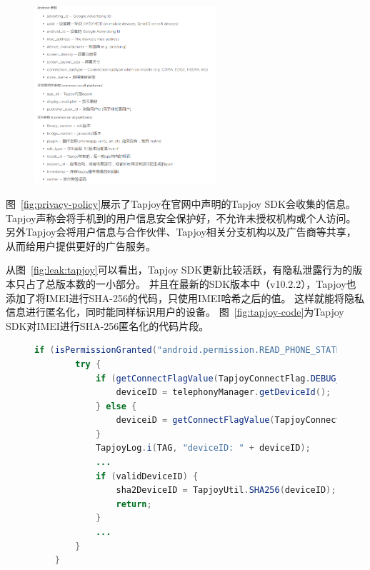 \begin{figure}
	\centering
	\includegraphics[width=0.6\textwidth]{figure/privacy-policy.png}
\end{figure}

图~\ref{fig:privacy-policy}展示了Tapjoy在官网中声明的Tapjoy SDK会收集的信息。
Tapjoy声称会将手机到的用户信息安全保护好，不允许未授权机构或个人访问。
另外Tapjoy会将用户信息与合作伙伴、Tapjoy相关分支机构以及广告商等共享，从而给用户提供更好的广告服务。

从图~\ref{fig:leak:tapjoy}可以看出，Tapjoy SDK更新比较活跃，有隐私泄露行为的版本只占了总版本数的一小部分。
并且在最新的SDK版本中（v10.2.2），Tapjoy也添加了将IMEI进行SHA-256的代码，只使用IMEI哈希之后的值。
这样就能将隐私信息进行匿名化，同时能同样标识用户的设备。
图~\ref{fig:tapjoy-code}为Tapjoy SDK对IMEI进行SHA-256匿名化的代码片段。

\begin{figure}[!h]
	\centering
	\begin{lstlisting}[language={java}]
	if (isPermissionGranted("android.permission.READ_PHONE_STATE")) {
		try {
			if (getConnectFlagValue(TapjoyConnectFlag.DEBUG_DEVICE_ID) == null || getConnectFlagValue(TapjoyConnectFlag.DEBUG_DEVICE_ID).length() <= 0) {
				deviceID = telephonyManager.getDeviceId();
			} else {
				deviceiD = getConnectFlagValue(TapjoyConnectFlag.DEBUG_DEVICE_ID);
			}
			TapjoyLog.i(TAG, "deviceID: " + deviceID);
			...
			if (validDeviceID) {
				sha2DeviceID = TapjoyUtil.SHA256(deviceID);
				return;
			}
			...
		}
	}
	\end{lstlisting}
\end{figure}



